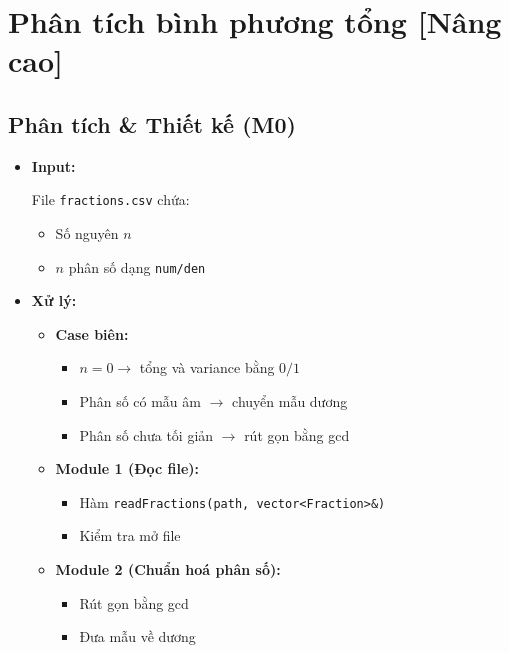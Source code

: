 \section{Phân tích bình phương tổng [Nâng cao]}
\subsection{Phân tích \& Thiết kế (M0)}

\begin{itemize}

    \item \textbf{Input:}

    File \texttt{fractions.csv} chứa:
    \begin{itemize}
        \item Số nguyên $n$
        \item $n$ phân số dạng \texttt{num/den}
    \end{itemize}

    \item \textbf{Xử lý:}

    \begin{itemize}

        \item \textbf{Case biên:}

        \begin{itemize}
            \item $n = 0 \rightarrow$ tổng và variance bằng $0/1$
            \item Phân số có mẫu âm $\rightarrow$ chuyển mẫu dương
            \item Phân số chưa tối giản $\rightarrow$ rút gọn bằng gcd
        \end{itemize}

        \item \textbf{Module 1 (Đọc file):}

        \begin{itemize}
            \item Hàm \texttt{readFractions(path, vector<Fraction>\&)}
            \item Kiểm tra mở file
        \end{itemize}

        \item \textbf{Module 2 (Chuẩn hoá phân số):}

        \begin{itemize}
            \item Rút gọn bằng gcd
            \item Đưa mẫu về dương
        \end{itemize}


\end{itemize}
\end{itemize}
